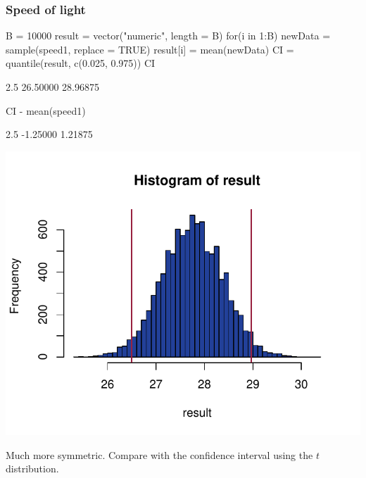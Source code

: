 \documentclass[a4paper]{article}
\begin{document}
\subsubsection{Speed of light}
\begin{Schunk}
\begin{Sinput}
B = 10000
result = vector("numeric", length = B)
for(i in 1:B){
  newData = sample(speed1, replace = TRUE)
  result[i] = mean(newData)
}
CI = quantile(result, c(0.025, 0.975))
CI
\end{Sinput}
\begin{Soutput}
    2.5%
26.50000 28.96875 
\end{Soutput}
\begin{Sinput}
CI - mean(speed1)
\end{Sinput}
\begin{Soutput}
    2.5%
-1.25000  1.21875 
\end{Soutput}


{\centering \includegraphics[width=\maxwidth]{figure/listings-unnamed-chunk-172-1} 

}

\end{Schunk}
Much more symmetric.
Compare with the confidence interval using the \( t \) distribution.
\end{document}
